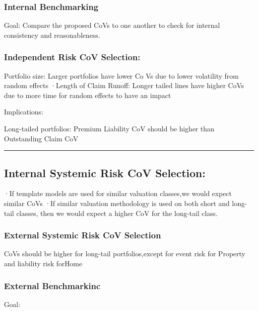 \documentclass[
]{article}
\begin{document}
\subsubsection{Internal Benchmarking}\label{internal-benchmarking}

Goal: Compare the proposed CoVs to one another to check for internal
consistency and reasonableness.

\subsubsection{Independent Risk CoV
Selection:}\label{independent-risk-cov-selection}

Portfolio size: Larger portfolios have lower Co Vs due to lower
volatility from random effects ·Length of Claim Runoff: Longer tailed
lines have higher CoVs due to more time for random effects to have an
impact

Implications:

Long-tailed portfolios: Premium Liability CoV should be higher than
Outstanding Claim CoV

\begin{center}\rule{0.5\linewidth}{0.5pt}\end{center}

\subsection{Internal Systemic Risk CoV
Selection:}\label{internal-systemic-risk-cov-selection}

·If template models are used for similar valuation classes,we would
expect similar CoVs ·If similar valuation methodology is used on both
short and long-tail classes, then we would expect a higher CoV for the
long-tail class.

\subsubsection{External Systemic Risk CoV
Selection}\label{external-systemic-risk-cov-selection}

CoVs should be higher for long-tail portfolios,except for event risk for
Property and liability risk forHome

\subsubsection{External Benchmarkinc}\label{external-benchmarkinc}

Goal:
\end{document}
